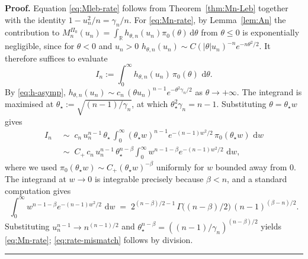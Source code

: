 \documentclass{article}%
\newenvironment{proof}[1][Proof]{\noindent\textbf{#1.} }{\ \rule{0.5em}{0.5em}}
\newcommand{\R}{\mathbb{R}}
\newcommand{\dd}{\,\mathrm{d}}
\begin{document}
\begin{proof}
Equation \eqref{eq:Mleb-rate} follows from Theorem~\ref{thm:Mn-Leb}
together with the identity \(1-u_n^2/n=\gamma_n/n\). For
\eqref{eq:Mn-rate}, by Lemma~\ref{lem:An} the contribution to
\(M_n^{\Pi_0}(u_n)=\int_\R h_{\theta,n}(u_n)\pi_0(\theta)\dd\theta\)
from \(\theta\leq 0\) is exponentially negligible, since for
\(\theta<0\) and \(u_n>0\)
\(h_{\theta,n}(u_n)\sim C(|\theta| u_n)^{-n}e^{-n\theta^2/2}\). It
therefore suffices to evaluate
\[
   I_n:=\int_0^\infty h_{\theta,n}(u_n)\,\pi_0(\theta)\,\dd\theta.
\]
By \eqref{eq:h-asymp},
\(h_{\theta,n}(u_n)\sim c_n\,(\theta u_n)^{n-1}e^{-\theta^2\gamma_n/2}\)
as \(\theta\to+\infty\). The integrand is maximised at
\(\theta_\star:=\sqrt{(n-1)/\gamma_n}\), at which
\(\theta_\star^2\gamma_n=n-1\). Substituting \(\theta=\theta_\star w\)
gives
\begin{align*}
  I_n
  &\;\sim\; c_n\,u_n^{n-1}\,\theta_\star\,
     \int_0^\infty (\theta_\star w)^{n-1}e^{-(n-1)w^2/2}\,
     \pi_0(\theta_\star w)\,\dd w\\
  &\;\sim\; C_+\,c_n\,u_n^{n-1}\,\theta_\star^{n-\beta}
     \int_0^\infty w^{n-1-\beta}e^{-(n-1)w^2/2}\,\dd w,
\end{align*}
where we used \(\pi_0(\theta_\star w)\sim C_+(\theta_\star w)^{-\beta}\)
uniformly for \(w\) bounded away from \(0\). The integrand at
\(w\to 0\) is integrable precisely because \(\beta<n\), and a
standard computation gives
\[
  \int_0^\infty w^{n-1-\beta}e^{-(n-1)w^2/2}\,\dd w
  \;=\; 2^{(n-\beta)/2-1}\,\Gamma\!\bigl((n-\beta)/2\bigr)\,
        (n-1)^{(\beta-n)/2}.
\]
Substituting \(u_n^{n-1}\to n^{(n-1)/2}\) and
\(\theta_\star^{n-\beta}=((n-1)/\gamma_n)^{(n-\beta)/2}\) yields
\eqref{eq:Mn-rate}; \eqref{eq:rate-mismatch} follows by division.
\end{proof}
\end{document}
